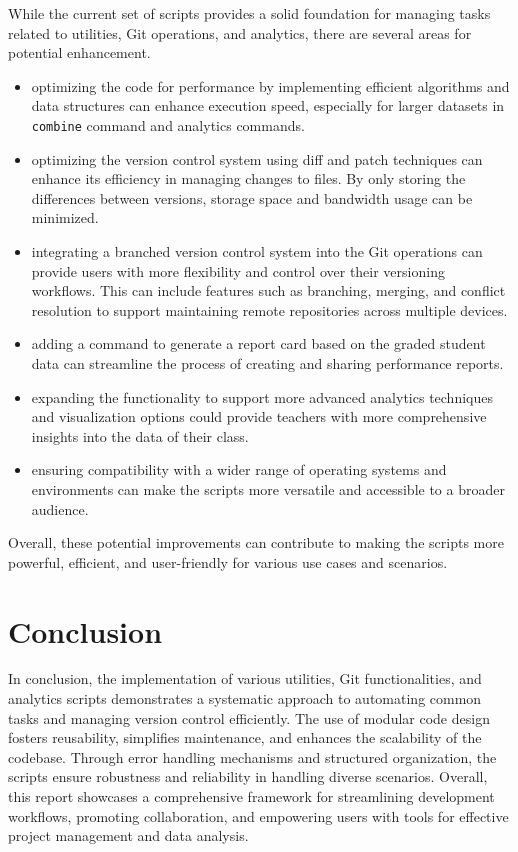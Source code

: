 \documentclass{article}
\begin{document}
While the current set of scripts provides a solid foundation for managing tasks related to utilities, Git operations, and analytics, there are several areas for potential enhancement. 
\begin{itemize}
    \item optimizing the code for performance by implementing efficient algorithms and data structures can enhance execution speed, especially for larger datasets in \texttt{combine} command and analytics commands.

    \item optimizing the version control system using diff and patch techniques can enhance its efficiency in managing changes to files. By only storing the differences between versions, storage space and bandwidth usage can be minimized.
    
    \item integrating a branched version control system into the Git operations can provide users with more flexibility and control over their versioning workflows. This can include features such as branching, merging, and conflict resolution to support maintaining remote repositories across multiple devices.

    \item adding a command to generate a report card based on the graded student data can streamline the process of creating and sharing performance reports.

    \item expanding the functionality to support more advanced analytics techniques and visualization options could provide teachers with more comprehensive insights into the data of their class.
    
    \item ensuring compatibility with a wider range of operating systems and environments can make the scripts more versatile and accessible to a broader audience.
    
\end{itemize}

Overall, these potential improvements can contribute to making the scripts more powerful, efficient, and user-friendly for various use cases and scenarios.

\section{Conclusion}
In conclusion, the implementation of various utilities, Git functionalities, and analytics scripts demonstrates a systematic approach to automating common tasks and managing version control efficiently. The use of modular code design fosters reusability, simplifies maintenance, and enhances the scalability of the codebase. Through error handling mechanisms and structured organization, the scripts ensure robustness and reliability in handling diverse scenarios. Overall, this report showcases a comprehensive framework for streamlining development workflows, promoting collaboration, and empowering users with tools for effective project management and data analysis.
\end{document}
